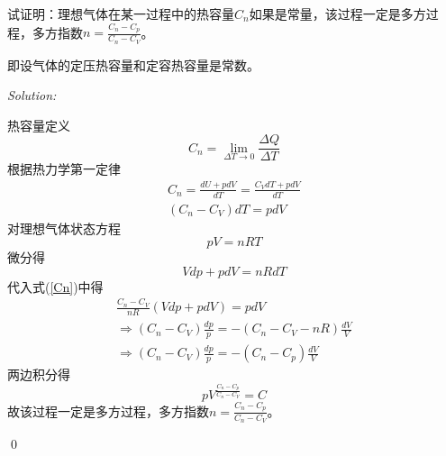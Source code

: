\documentclass[12pt,a4paper]{article}
\newenvironment{problem}[2][Problem]{\begin{trivlist}
\item[\hskip \labelsep {\bfseries #1}\hskip \labelsep {\bfseries #2.}]}{\end{trivlist}}
\newenvironment{sol}
    {\emph{Solution:}
    }
    {
    \qed
    }
\begin{document}
\begin{problem}{1-9}
试证明：理想气体在某一过程中的热容量$C_n$如果是常量，该过程一定是多方过程，多方指数$n=\frac{C_n-C_p}{C_n-C_V}$。

即设气体的定压热容量和定容热容量是常数。
\end{problem}
\begin{sol}
热容量定义
\begin{equation}
C_n=\lim_{\Delta T\rightarrow0}\frac{\Delta Q}{\Delta T}
\end{equation}
根据热力学第一定律
\begin{gather}
C_n=\frac{dU+pdV}{dT}=\frac{C_VdT+pdV}{dT}\\
\label{Cn}(C_n-C_V)dT=pdV
\end{gather}
对理想气体状态方程
\begin{equation}
pV=nRT
\end{equation}
微分得
\begin{equation}
Vdp+pdV=nRdT
\end{equation}
代入式(\ref{Cn})中得
\begin{gather}
\frac{C_n-C_V}{nR}(Vdp+pdV)=pdV\\
\Longrightarrow(C_n-C_V)\frac{dp}{p}=-(C_n-C_V-nR)\frac{dV}{V}\\
\Longrightarrow(C_n-C_V)\frac{dp}{p}=-(C_n-C_p)\frac{dV}{V}
\end{gather}
两边积分得
\begin{equation}
pV^{\frac{C_n-C_p}{C_n-C_V}}=C
\end{equation}
故该过程一定是多方过程，多方指数$n=\frac{C_n-C_p}{C_n-C_V}$。
\end{sol}
\end{document}
